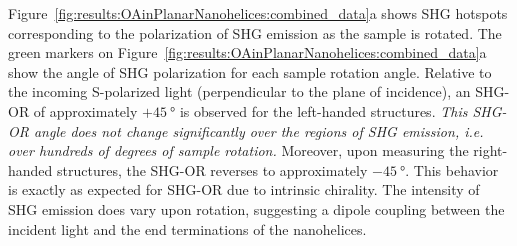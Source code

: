 Figure~\ref{fig:results:OAinPlanarNanohelices:combined_data}a shows SHG hotspots corresponding to the polarization of SHG emission as the sample is rotated. The green markers on Figure~\ref{fig:results:OAinPlanarNanohelices:combined_data}a show the angle of SHG polarization for each sample rotation angle. Relative to the incoming S-polarized light (perpendicular to the plane of incidence), an SHG-OR of approximately $+\SI{45}{\degree}$ is observed for the left-handed structures. \textit{This SHG-OR angle does not change significantly over the regions of SHG emission, i.e. over hundreds of degrees of sample rotation.} 
Moreover, upon measuring the right-handed structures, the SHG-OR reverses to approximately $-\SI{45}{\degree}$. This behavior is exactly as expected for SHG-OR due to intrinsic chirality. The intensity of SHG emission does vary upon rotation, suggesting a dipole coupling between the incident light and the end terminations of the nanohelices. 

